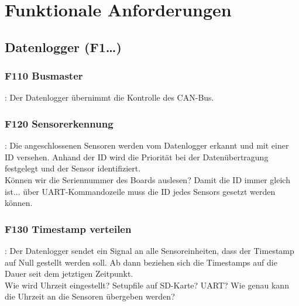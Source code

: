 %
%

\thispagestyle{empty}
\chapter{Funktionale Anforderungen}\label{chap.funktionale}
\section{Datenlogger (F1\ldots)}
\subsection{F110 Busmaster}: Der Datenlogger übernimmt die Kontrolle des CAN-Bus. 

\subsection{F120 Sensorerkennung}: Die angeschlossenen Sensoren werden vom Datenlogger erkannt und mit einer ID versehen. Anhand der ID wird die Priorität bei der Datenübertragung festgelegt und der Sensor identifiziert.\\
Können wir die Seriennummer des Boards auslesen? Damit die ID immer gleich ist... über UART-Kommandozeile muss die ID jedes Sensors gesetzt werden können.

\subsection{F130 Timestamp verteilen}: Der Datenlogger sendet ein Signal an alle Sensoreinheiten, dass der Timestamp auf Null gestellt werden soll. Ab dann beziehen sich die Timestamps auf die Dauer seit dem jetztigen Zeitpunkt.\\
Wie wird Uhrzeit eingestellt? Setupfile auf SD-Karte? UART? Wie genau kann die Uhrzeit an die Sensoren übergeben werden?

